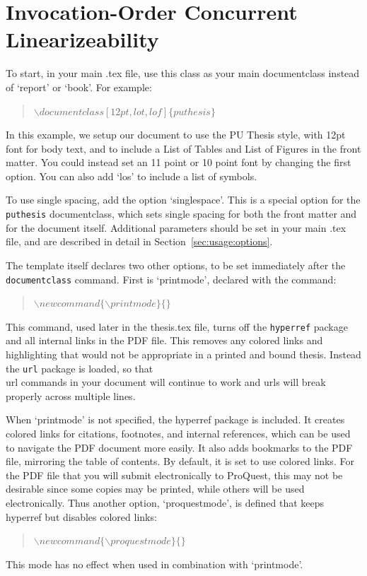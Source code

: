 
\chapter{Invocation-Order Concurrent Linearizeability\label{ch:iocl}}

To start, in your main .tex file, use this class as your main documentclass instead of `report' or `book'. For example:
\begin{quote}
$\backslash documentclass[12pt,lot, lof]\{puthesis\}$
\end{quote}

In this example, we setup our document to use the PU Thesis style, with 12pt font for body text, and to include a List of Tables and List of Figures in the front matter. You could instead set an 11 point or 10 point font by changing the first option. You can also add `los' to include a list of symbols.

To use single spacing, add the option `singlespace'. This is a special option for the \texttt{puthesis} documentclass, which sets single spacing for both the front matter and for the document itself. Additional parameters should be set in your main .tex file, and are described in detail in Section~\ref{sec:usage:options}.

The template itself declares two other options, to be set immediately after the \texttt{documentclass} command. First is `printmode', declared with the command:
\begin{quote}
$\backslash newcommand\{\backslash printmode\}\{\}$
\end{quote}
This command, used later in the thesis.tex file, turns off the \texttt{hyperref} package and all internal links in the PDF file. This removes any colored links and highlighting that would not be appropriate in a printed and bound thesis. Instead the \texttt{url} package is loaded, so that \\url commands in your document will continue to work and urls will break properly across multiple lines.

When `printmode' is not specified, the hyperref package is included. It creates colored links for citations, footnotes, and internal references, which can be used to navigate the PDF document more easily. It also adds bookmarks to the PDF file, mirroring the table of contents. By default, it is set to use colored links. For the PDF file that you will submit electronically to ProQuest, this may not be desirable since some copies may be printed, while others will be used electronically. Thus another option, `proquestmode', is defined that keeps hyperref but disables colored links:
\begin{quote}
$\backslash newcommand\{\backslash proquestmode\}\{\}$
\end{quote}
This mode has no effect when used in combination with `printmode'. 


 





